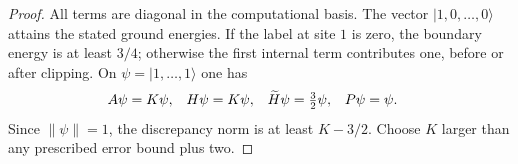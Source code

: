 \begin{proof}\notready
    All terms are diagonal in the computational basis. The vector
    $|1,0,\ldots,0\rangle$ attains the stated ground energies.
    If the label at site $1$ is zero, the boundary energy is at least $3/4$;
    otherwise the first internal term contributes one, before or after clipping.
    On $\psi=|1,\ldots,1\rangle$ one has
    \begin{align}
        A\psi            & =K\psi,        &
        H\psi            & =K\psi,        &
        \widetilde H\psi & =\tfrac32\psi, &
        P\psi            & =\psi.\notag
    \end{align}
    Since $\|\psi\|=1$, the discrepancy norm is at least $K-3/2$.
    Choose $K$ larger than any prescribed error bound plus two.
\end{proof}
